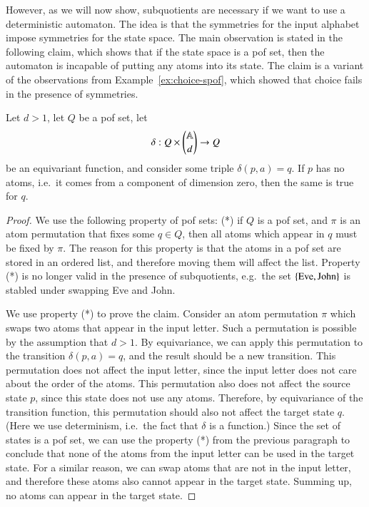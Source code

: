 \begin{myexample}
    However, as we will now show, subquotients are necessary if we want to use a deterministic automaton. The idea is that the symmetries for the input alphabet impose symmetries for the state space. The main observation is stated in the following claim, which shows that if the state space is a pof set, then the automaton is incapable of putting any atoms into its state. The claim is a variant of the observations from Example~\ref{ex:choice-spof}, which showed that choice fails in the presence of symmetries.
    \begin{claim}
        Let $d > 1$, let  $Q$ be a pof set,  let 
            \begin{align*}
    \delta : Q \times {\mathbb A\choose d} \to Q 
    \end{align*}
    be an equivariant function, and consider some triple $\delta(p,a)=q$. If $p$ has no atoms, i.e.~it comes from  a component of dimension zero, then the same is true for $q$.
    \end{claim}
    \begin{proof}
        We use the following property of pof sets: (*) if $Q$  is  a pof set, and $\pi$ is an atom permutation that fixes some $q \in Q$, then all atoms which appear in $q$ must be fixed by $\pi$. The reason for this property is that the atoms in a pof set are stored in an ordered list, and therefore moving them will affect the list.  Property (*) is no longer valid in the presence of subquotients, e.g.~the set $\{\text{Eve}, \text{John}\}$ is stabled under swapping Eve  and John.

        We use property (*) to prove the claim. 
        Consider an atom permutation $\pi$ which swaps two atoms that appear in the input letter. Such a permutation is possible by the assumption that $d>1$. By equivariance, we can apply this permutation to the transition $\delta(p,a)=q$, and the result should be a new transition. This permutation does not affect the input letter, since the input letter does not care about the order of the atoms. This permutation also does not affect the source state $p$, since this state does not use any atoms. Therefore, by equivariance of the transition function, this permutation should also not affect the target state $q$. (Here we use determinism, i.e.~the fact that $\delta$ is a function.)  Since the set of states is a pof set, we can use the property (*) from the previous paragraph to conclude that none of the atoms from the input letter can be used in the target state. For a similar reason, we can swap atoms that are not in the input letter, and therefore these atoms also cannot appear in the target state.  Summing up, no atoms can appear in the target state. 
    \end{proof}


\end{myexample}
